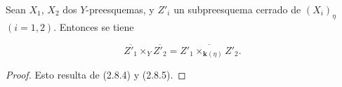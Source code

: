 \begin{corollary}[2.8.6]
\label{IV.2.8.6-fr}
Sean $X_1$, $X_2$ dos $Y$-preesquemas, y $Z'_i$ un subpreesquema cerrado de
$(X_i)_\eta$ $(i=1,2)$. Entonces se tiene
\end{corollary}

\begin{env}[2.8.6.1]
\label{IV.2.8.6.1-fr}
\[
\overline{Z'_1}\times_Y\overline{Z'_2}
=\overline{Z'_1\times_{\mathbf{k}(\eta)}Z'_2}.
\]
\end{env}

\begin{proof}
Esto resulta de (2.8.4) y (2.8.5).
\end{proof}
